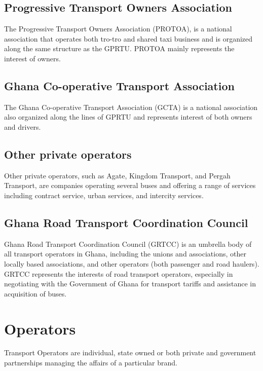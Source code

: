 \subsection{Progressive Transport Owners Association}
The Progressive Transport Owners Association (PROTOA), is a national association that operates both tro-tro and shared taxi business and is organized along the same structure as the GPRTU. PROTOA mainly represents the interest of owners. 

\subsection{Ghana Co-operative Transport Association}
The Ghana Co-operative Transport Association (GCTA) is a national association also organized along the lines of GPRTU and represents interest of both owners and drivers.

\subsection{Other private operators}
Other private operators, such as Agate, Kingdom Transport, and Pergah Transport, are companies operating several buses and offering a range of services including contract service, urban services, and intercity services.

\subsection{Ghana Road Transport Coordination Council}
Ghana Road Transport Coordination Council (GRTCC) is an umbrella body of all transport operators in Ghana, including the unions and associations, other locally based associations, and other operators (both passenger and road haulers). GRTCC represents the interests of road transport operators, especially in negotiating with the Government of Ghana for transport tariffs and assistance in acquisition of buses.

\section{Operators}
Transport Operators are individual, state owned or both private and government partnerships managing the affairs of a particular brand.

